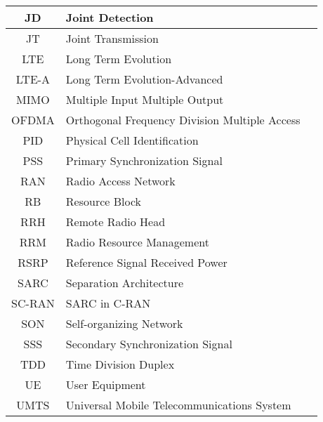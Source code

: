 \documentclass[article,10pt,twocolumn]{IEEEtran}
\begin{document}
\begin{table}[t]
\begin{tabular}{c||lc}
    	\hline
	JD	&	Joint Detection\\
    	\hline
	JT	&	Joint Transmission\\
    	\hline
	LTE	&	Long Term Evolution\\
    	\hline
	LTE-A	&	Long Term Evolution-Advanced\\
    	\hline
	MIMO	&	Multiple Input Multiple Output\\
    	\hline
	OFDMA&	Orthogonal Frequency Division Multiple Access\\
    	\hline
	PID	&	Physical Cell Identification\\
    	\hline
	PSS	&	Primary Synchronization Signal\\
    	\hline
	RAN	&	Radio Access Network\\
    	\hline
	RB	&	Resource Block\\
    	\hline
	RRH	&	Remote Radio Head\\
    	\hline
	RRM	&	Radio Resource Management\\
    	\hline
	RSRP	&	Reference Signal Received Power\\
    	\hline
	SARC	&	Separation Architecture\\
    	\hline
	SC-RAN&	SARC in C-RAN\\
    	\hline
	SON	&	Self-organizing Network\\
    	\hline
	SSS	&	Secondary Synchronization Signal\\
    	\hline
	TDD	&	Time Division Duplex\\
    	\hline
	UE	&	User Equipment\\
    	\hline
	UMTS & 	Universal Mobile Telecommunications System\\
	\hline
    \end{tabular}
\vspace*{-\baselineskip}
\end{table}
\end{document}
